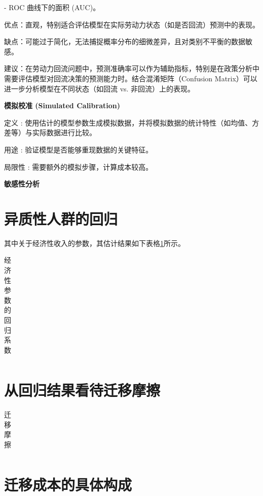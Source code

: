 \documentclass[
  a4paper,
  zihao=-4,
  fontset=mac,
  AutoFakeBold,
  AutoFakeSlant,
  oneside]{ctexbook}
\begin{document}
- ROC 曲线下的面积 (AUC)。

优点：直观，特别适合评估模型在实际劳动力状态（如是否回流）预测中的表现。

缺点：可能过于简化，无法捕捉概率分布的细微差异，且对类别不平衡的数据敏感。

建议：在劳动力回流问题中，预测准确率可以作为辅助指标，特别是在政策分析中需要评估模型对回流决策的预测能力时。结合混淆矩阵（Confusion Matrix）可以进一步分析模型在不同状态（如回流 vs. 非回流）上的表现。


\textbf{模拟校准 (Simulated Calibration)}

定义 : 使用估计的模型参数生成模拟数据，并将模拟数据的统计特性（如均值、方差等）与实际数据进行比较。

用途 : 验证模型是否能够重现数据的关键特征。

局限性 : 需要额外的模拟步骤，计算成本较高。

\textbf{敏感性分析}


\section{异质性人群的回归} 

其中关于经济性收入的参数，其估计结果如下表格\ref{tab:经济性参数的回归系数}所示。
\begin{table}[!ht]
\centering
\caption{经济性参数的回归系数}
\begin{tabularx}{\textwidth}{@{}cXXX@{}}
\toprule
\midrule
\bottomrule
\end{tabularx}
\label{tab:经济性参数的回归系数}
\end{table}


\section{从回归结果看待迁移摩擦}


\begin{table}[!ht]
\centering
\caption{迁移摩擦}
\begin{tabularx}{\textwidth}{@{}cXXX@{}}
\toprule
\midrule
\bottomrule
\end{tabularx}
\label{tab:迁移摩擦}
\end{table}



\section{迁移成本的具体构成}
\end{document}
